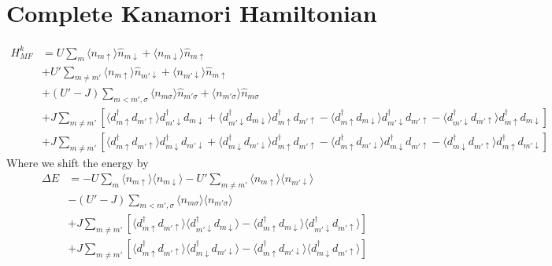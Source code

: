 \documentclass[11pt]{article}
\begin{document}
\section{Complete Kanamori Hamiltonian}
\begin{align}
    H^k_{MF} &= U \sum_m \langle n_{m\uparrow}\rangle \hat n_{m\downarrow} + \langle n_{m\downarrow}\rangle \hat n_{m\uparrow} \\\nonumber
    &+ U' \sum_{m \neq m'} \langle n_{m\uparrow}\rangle \hat n_{m'\downarrow}
    + \langle n_{m' \downarrow}\rangle \hat n_{m\uparrow}  \\\nonumber
    &+ (U'-J) \sum_{m < m', \sigma} \langle n_{m\sigma} \rangle \hat n_{m'\sigma}
    + \langle n_{m' \sigma} \rangle \hat n_{m\sigma} \\\nonumber
    &+ J\sum_{m\neq m'}\left[\langle d^\dagger_{m\uparrow} d_{m'\uparrow} \rangle d^\dagger_{m' \downarrow} d_{m\downarrow}
    + \langle d^\dagger_{m' \downarrow} d_{m\downarrow}\rangle d^\dagger_{m\uparrow}d_{m' \uparrow}
    - \langle d^\dagger_{m \uparrow} d_{m\downarrow}\rangle d^\dagger_{m'\downarrow}d_{m'\uparrow}
    - \langle d^\dagger_{m'\downarrow} d_{m'\uparrow} \rangle d^\dagger_{m\uparrow} d_{m \downarrow}\right] \\\nonumber
    &+ J\sum_{m\neq m'}\left[
        \langle d^\dagger_{m\uparrow} d_{m'\uparrow}\rangle d^\dagger_{m\downarrow} d_{m'\downarrow}
        +\langle d^\dagger_{m\downarrow} d_{m'\downarrow}\rangle d^\dagger_{m\uparrow}d_{m'\uparrow}
        - \langle d^\dagger_{m\uparrow} d_{m'\downarrow}\rangle d^\dagger_{m\downarrow}d_{m'\uparrow}
        - \langle d^\dagger_{m\downarrow} d_{m'\uparrow}\rangle d^\dagger_{m\uparrow} d_{m'\downarrow}
    \right]
\end{align}
Where we shift the energy by
\begin{align}
    \Delta E &= -U \sum_m \langle n_{m\uparrow}\rangle \langle n_{m\downarrow}\rangle
    - U' \sum_{m\neq m'} \langle n_{m\uparrow}\rangle \langle n_{m'\downarrow}\rangle \\\nonumber
    &- (U'-J) \sum_{m < m',\sigma} \langle n_{m\sigma} \rangle \langle n_{m'\sigma} \rangle \\\nonumber
    &+ J\sum_{m\neq m'} \left[
        \langle d^\dagger_{m\uparrow} d_{m'\uparrow} \rangle 
        \langle d^\dagger_{m'\downarrow} d_{m\downarrow}\rangle
        -\langle d^\dagger_{m\uparrow} d_{m\downarrow}\rangle 
        \langle d^\dagger_{m'\downarrow} d_{m'\uparrow}\rangle
    \right] \\\nonumber
    &+ J\sum_{m\neq m'}\left[
        \langle d^\dagger_{m\uparrow} d_{m'\uparrow}\rangle 
        \langle d^\dagger_{m\downarrow} d_{m'\downarrow} \rangle
        - \langle d^\dagger_{m\uparrow} d_{m' \downarrow} \rangle
        \langle d^\dagger_{m\downarrow}d_{m'\uparrow}\rangle
    \right]
\end{align}
\end{document}

